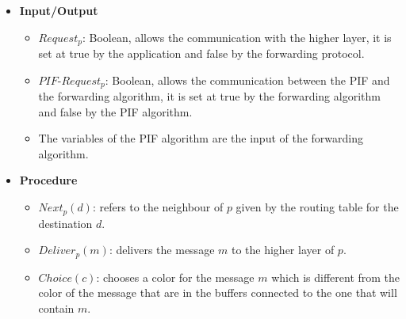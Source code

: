 \documentclass{llncs}
\begin{document}
\begin{itemize}
   \item \textbf{Input/Output}
           \begin{itemize}
            \item $Request_{p}$: Boolean, allows the communication with the higher layer, it is set at true by the application and false by the forwarding protocol.
             \item $PIF\mbox{-}Request_{p}$: Boolean, allows the communication between the PIF and the forwarding algorithm, it is set at true by the forwarding algorithm and false by the PIF algorithm.
             \item{The variables of the PIF algorithm are the input of the forwarding algorithm.}
            \end{itemize}

   \item \textbf{Procedure}
            \begin{itemize}
             \item $Next_{p}(d)$: refers to the neighbour of $p$ given by the routing table for the destination $d$.
             \item $Deliver_{p}(m)$: delivers the message $m$ to the higher layer of $p$. 
             \item $Choice(c)$: chooses a color for the message $m$ which is different from the color of the message 
                   that are in the buffers connected to the one that will contain $m$.
             \end{itemize}
             

\end{itemize}
\end{document}
